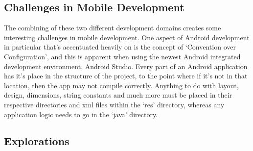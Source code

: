 \documentclass[11pt,english,numbers=endperiod,parskip=half]{scrartcl}
\begin{document}
  \subsection{Challenges in Mobile Development}
    The combining of these two different development domains creates some
    interesting challenges in mobile development. One aspect of Android
    development in particular that's accentuated heavily on is the concept of
    `Convention over Configuration', and this is apparent when using the newest
    Android integrated development environment, Android Studio. Every part of an
    Android application has it's place in the structure of the project, to the
    point where if it's not in that location, then the app may not compile
    correctly. Anything to do with layout, design, dimensions, string constants
    and much more must be placed in their respective directories and xml files
    within the `res' directory, whereas any application logic needs to go in the
    `java' directory.
  \subsection{Explorations}
\end{document}
